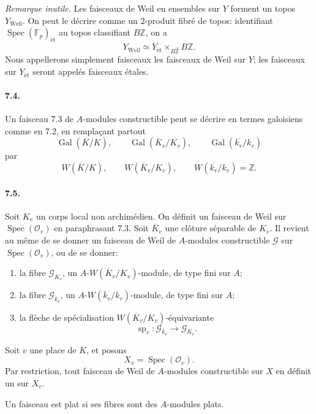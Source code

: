 \documentclass[10pt]{article}
\newcommand{\F}{\mathbb F}
\newcommand{\Gal}{\operatorname{Gal}}
\newcommand{\Spec}{\operatorname{Spec}}
\providecommand{\spc}{\operatorname{sp}}
\providecommand{\Spec}{\operatorname{Spec}}
\providecommand{\Gal}{\operatorname{Gal}}
\providecommand{\spc}{\operatorname{sp}}
\providecommand{\Gal}{\operatorname{Gal}}
\providecommand{\Spec}{\operatorname{Spec}}
\providecommand{\Spec}{\operatorname{Spec}}
\providecommand{\Gal}{\operatorname{Gal}}
\providecommand{\spc}{\operatorname{sp}}
\providecommand{\Gal}{\operatorname{Gal}}
\begin{document}
\emph{Remarque inutile.} Les faisceaux de Weil en ensembles sur \(Y\) forment un topos \(Y_{\mathrm{Weil}}\). On peut le décrire comme un \(2\)-produit fibré de topos: identifiant \(\Spec(\F_p)_{\mathrm{\acute et}}\) au topos classifiant \(B\widehat{\mathbb Z}\), on a
\[
Y_{\mathrm{Weil}}\simeq
\overline Y_{\mathrm{\acute et}}\times_{B\widehat{\mathbb Z}}B\mathbb Z.
\]
Nous appellerons simplement faisceaux les faisceaux de Weil sur \(Y\); les faisceaux sur \(Y_{\mathrm{\acute et}}\) seront appelés faisceaux étales.

\paragraph{7.4.} Un faisceau 7.3 de \(A\)-modules constructible peut se décrire en termes galoisiens comme en 7.2, en remplaçant partout
\[
\Gal(\overline K/K),\qquad
\Gal(\overline K_v/K_v),\qquad
\Gal(\overline{k_v}/k_v)
\]
par
\[
W(\overline K/K),\qquad
W(\overline K_v/K_v),\qquad
W(\overline{k_v}/k_v)=\mathbb Z.
\]

\paragraph{7.5.} Soit \(K_v\) un corps local non archimédien. On définit un faisceau de Weil sur \(\Spec(\mathcal O_v)\) en paraphrasant 7.3. Soit \(\overline K_v\) une clôture séparable de \(K_v\). Il revient au même de se donner un faisceau de Weil de \(A\)-modules constructible \(\mathcal G\) sur \(\Spec(\mathcal O_v)\), ou de se donner:
\begin{enumerate}[label=\alph*)]
\item la fibre \(\mathcal G_{\overline K_v}\), un \(A\)-\(W(\overline K_v/K_v)\)-module, de type fini sur \(A\);
\item la fibre \(\mathcal G_{\overline k_v}\), un \(A\)-\(W(\overline k_v/k_v)\)-module, de type fini sur \(A\);
\item la flèche de spécialisation \(W(\overline K_v/K_v)\)-équivariante
\[
\spc_v:\mathcal G_{\overline k_v}\longrightarrow\mathcal G_{\overline K_v}.
\]
\end{enumerate}
Soit \(v\) une place de \(K\), et posons
\[
X_v=\Spec(\mathcal O_v).
\]
Par restriction, tout faisceau de Weil de \(A\)-modules constructible sur \(X\) en définit un sur \(X_v\).

Un faisceau est plat si ses fibres sont des \(A\)-modules plats.
\end{document}

